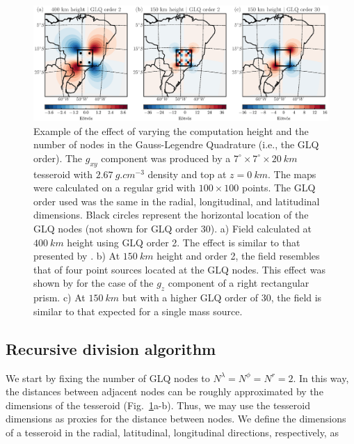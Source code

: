 \begin{figure}
    \centering
    \includegraphics[width=\textwidth]{figs/vary-height-and-order}
    \caption{
        Example of the effect of varying
        the computation height
        and the number of nodes in the Gauss-Legendre Quadrature
        (i.e., the GLQ order).
        The $g_{xy}$ component was produced by a
        $7^\circ \times 7^\circ \times 20\ km$ tesseroid
        with $2.67\ g.cm^{-3}$ density
        and top at $z=0\ km$.
        The maps were calculated on a regular grid
        with $100\times100$ points.
        The GLQ order used was the same
        in the radial, longitudinal, and latitudinal dimensions.
        Black circles represent the horizontal location of the GLQ nodes
        (not shown for GLQ order 30).
        a) Field calculated at $400\ km$ height using GLQ order 2.
        The effect is similar to that presented by \citet{Asgharzadeh2007}.
        b) At $150\ km$ height and order 2,
        the field resembles that of
        four point sources located at the GLQ nodes.
        This effect was shown by \citet{Ku1977}
        for the case of the $g_z$ component of a right rectangular prism.
        c) At $150\ km$ but with a higher GLQ order of 30,
        the field is similar to that expected for a single mass source.
    }
    \label{fig:sample}
\end{figure}


\subsection{Recursive division algorithm}

We start by fixing the number of GLQ nodes to
$N^\lambda=N^\phi=N^r=2$.
In this way, the distances between adjacent nodes
can be roughly approximated by the dimensions of the tesseroid
(Fig.~\ref{fig:sample}a-b).
Thus, we may use the tesseroid dimensions
as proxies for the distance between nodes.
We define the dimensions of a tesseroid
in the radial, latitudinal, longitudinal directions, respectively,
as

